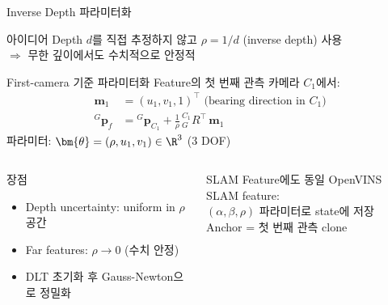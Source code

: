 \begin{frame}[shrink=10]{Inverse Depth 파라미터화}
  \begin{block}{아이디어}
    Depth $d$를 직접 추정하지 않고 $\rho = 1/d$ (inverse depth) 사용\\
    $\Rightarrow$ 무한 깊이에서도 수치적으로 안정적
  \end{block}
  \begin{block}{First-camera 기준 파라미터화}
    Feature의 첫 번째 관측 카메라 $C_1$에서:
    \begin{align*}
      \bm{m}_1 &= (u_1, v_1, 1)^\top \text{ (bearing direction in } C_1 \text{)}\\
      {}^G\bm{p}_f &= {}^G\bm{p}_{C_1} + \frac{1}{\rho}\,{}^{C_1}_G R^\top\,\bm{m}_1
    \end{align*}
    파라미터: $\bm{\theta} = (\rho, u_1, v_1) \in \R^3$ (3 DOF)
  \end{block}
  \begin{columns}[T]
      \begin{exampleblock}{장점}
        \begin{itemize}
          \item Depth uncertainty: uniform in $\rho$ 공간
          \item Far features: $\rho \to 0$ (수치 안정)
          \item DLT 초기화 후 Gauss-Newton으로 정밀화
        \end{itemize}
      \end{exampleblock}
      \begin{exampleblock}{SLAM Feature에도 동일}
        OpenVINS SLAM feature:\\
        $(\alpha, \beta, \rho)$ 파라미터로 state에 저장\\
        Anchor = 첫 번째 관측 clone
      \end{exampleblock}
  \end{columns}
\end{frame}


